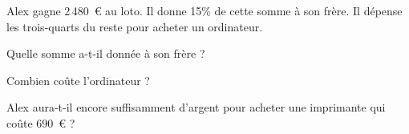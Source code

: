 Alex gagne 2\,480~\textgreek{\euro} au loto. Il donne 15\% de cette
somme à son frère. Il dépense les trois-quarts du reste pour acheter
un ordinateur.
\begin{myenumerate}
\item Quelle somme a-t-il donnée à son frère ?
\item Combien coûte l'ordinateur ?
\item Alex aura-t-il encore suffisamment d'argent pour acheter une
imprimante qui coûte 690~\textgreek{\euro} ?
\end{myenumerate}